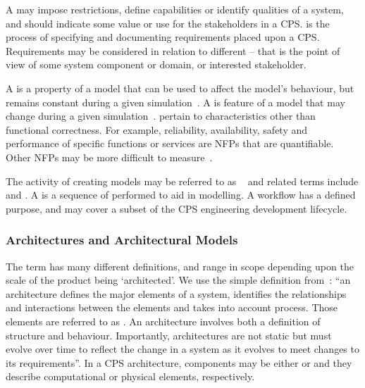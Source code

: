 A  may impose restrictions, define capabilities or identify qualities of a system, and should indicate some value or use for the stakeholders in a CPS.  is the process of specifying and documenting requirements placed upon a CPS. Requirements may be considered in relation to different  -- that is the point of view of some system component or domain, or interested stakeholder.

A  is a property of a model that can be used to affect the model's behaviour, but remains constant during a given simulation~\cite{Broenink&12b}. A  is feature of a model that may change during a given simulation~\cite{Broenink&12b}.  pertain to characteristics other than functional correctness. For example, reliability, availability, safety and performance of specific functions or services are NFPs that are quantifiable. Other NFPs may be more difficult to measure~\cite{Payne&10}.

The activity of creating models may be referred to as  ~\cite{Fitzgerald&14c} and related terms include  and . A  is a sequence of  performed to aid in modelling. A workflow has a defined purpose, and may cover a subset of the CPS engineering development lifecycle.

\subsubsection{Architectures and Architectural Models}
\label{sec:concepts:arch}
The term  has many different definitions, and range in scope depending upon the scale of the product being `architected'. We use the simple definition from~\cite{COMPASSD22.6}:  ``an architecture defines the major elements of a system, identifies the relationships and interactions between the elements and takes into account process. Those elements are referred to as . An architecture involves both a definition of structure and behaviour. Importantly, architectures are not static but must evolve over time to reflect the change in a system as it evolves to meet changes to its requirements''. In a CPS architecture, components may be either  or  and they describe computational or physical elements, respectively.

